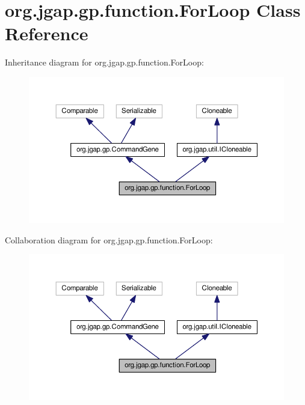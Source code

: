 \hypertarget{classorg_1_1jgap_1_1gp_1_1function_1_1_for_loop}{\section{org.\-jgap.\-gp.\-function.\-For\-Loop Class Reference}
\label{classorg_1_1jgap_1_1gp_1_1function_1_1_for_loop}
}


Inheritance diagram for org.\-jgap.\-gp.\-function.\-For\-Loop\-:
\nopagebreak
\begin{figure}[H]
\begin{center}
\leavevmode
\includegraphics[width=350pt]{classorg_1_1jgap_1_1gp_1_1function_1_1_for_loop__inherit__graph}
\end{center}
\end{figure}


Collaboration diagram for org.\-jgap.\-gp.\-function.\-For\-Loop\-:
\nopagebreak
\begin{figure}[H]
\begin{center}
\leavevmode
\includegraphics[width=350pt]{classorg_1_1jgap_1_1gp_1_1function_1_1_for_loop__coll__graph}
\end{center}
\end{figure}
